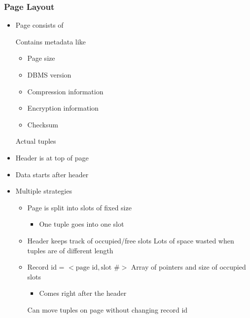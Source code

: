 \subsubsection{Page Layout}
\begin{itemize}
    \item Page consists of
        \begin{itemize}
             Contains metadata like
                \begin{itemize}
                    \item Page size
                    \item DBMS version
                    \item Compression information
                    \item Encryption information
                    \item Checksum
                \end{itemize}
             Actual tuples
        \end{itemize}
    \item Header is at top of page
    \item Data starts after header
    \item Multiple strategies
        \begin{itemize}
            \item Page is split into slots of fixed size
                \begin{itemize}
                    \item One tuple goes into one slot
                \end{itemize}
            \item Header keeps track of occupied/free slots
            \icon Lots of space wasted when tuples are of different length
        \end{itemize}
        \begin{itemize}
            \item Record id = $<\text{page id}, \text{slot \#}>$
             Array of pointers and size of occupied slots
                \begin{itemize}
                    \item Comes right after the header
                \end{itemize}
            \ipro Can move tuples on page without changing record id
        \end{itemize}
\end{itemize}


